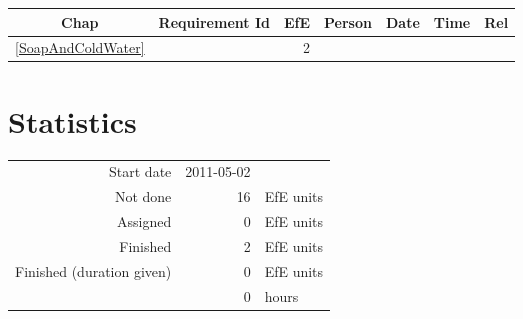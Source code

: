 {\small \begin{longtable}{|c|p{5.5cm}||r|l|l|r|r|} \hline
\textbf{Chap} & \textbf{Requirement Id} & \textbf{EfE} & \textbf{Person} & \textbf{Date} & \textbf{Time} & \textbf{Rel} \\ \hline\endhead
\ref{SoapAndColdWater} & \nameref{SoapAndColdWater} & 2 & \  &  & \  & \  \\ \hline
\end{longtable}}\section{Statistics}
\begin{longtable}{rrl}
Start date & 2011-05-02 & \\ 
Not done & 16 & EfE units \\ 
Assigned & 0 & EfE units \\ 
Finished & 2 & EfE units \\ 
Finished (duration given) & 0 & EfE units \\ 
 & 0 & hours \\ 
\end{longtable}